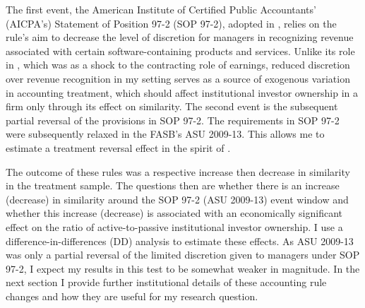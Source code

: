 \documentclass[thesis]{thesis-umich}
\begin{document}
The first event, the American Institute of Certified Public Accountants' (AICPA's) Statement of Position 97-2 (SOP 97-2), adopted in \cite{srivastava2014}, relies on the rule's aim to decrease the level of discretion for managers in recognizing revenue associated with certain software-containing products and services. Unlike its role in \cite{srivastava2014}, which was as a shock to the contracting role of earnings, reduced discretion over revenue recognition in my setting serves as a source of exogenous variation in accounting treatment, which should affect institutional investor ownership in a firm only through its effect on similarity. The second event is the subsequent partial reversal of the provisions in SOP 97-2. The requirements in SOP 97-2 were subsequently relaxed in the FASB's ASU 2009-13. This allows me to estimate a treatment reversal effect in the spirit of \cite{leary2009}. 

The outcome of these rules was a respective increase then decrease in similarity in the treatment sample. The questions then are whether there is an increase (decrease) in similarity around the SOP 97-2 (ASU 2009-13) event window and whether this increase (decrease) is associated with an economically significant effect on the ratio of active-to-passive institutional investor ownership. I use a difference-in-differences (DD) analysis to estimate these effects. As ASU 2009-13 was only a partial reversal of the limited discretion given to managers under SOP 97-2, I expect my results in this test to be somewhat weaker in magnitude. In the next section I provide further institutional details of these accounting rule changes and how they are useful for my research question.
\end{document}
